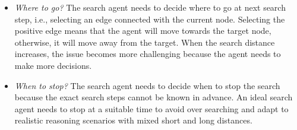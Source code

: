 \begin{itemize}[leftmargin=-1pt,topsep = -1 pt,partopsep= 1 pt,labelwidth=3pt,labelsep= 1 pt]
    \setlength{\itemsep}{0pt}
    \setlength{\parsep}{0pt}
    \setlength{\parskip}{0pt}
    \item[{\romannumeral1})] \textit{Where to go?} The search agent needs to decide where to go at next search step, i.e., selecting an edge connected with the current node. 
    Selecting the positive edge means that the agent will move towards the target node, otherwise, it will move away from the target.
        When the search distance increases, the issue becomes more challenging because the agent needs to make more decisions.
   
    \item[{\romannumeral2})] \textit{When to stop?} The search agent needs to decide when to stop the search because the exact search steps cannot be known in advance. An ideal search agent needs to stop at a suitable time to avoid over searching and adapt to realistic reasoning scenarios with mixed short and long distances.
\end{itemize}

